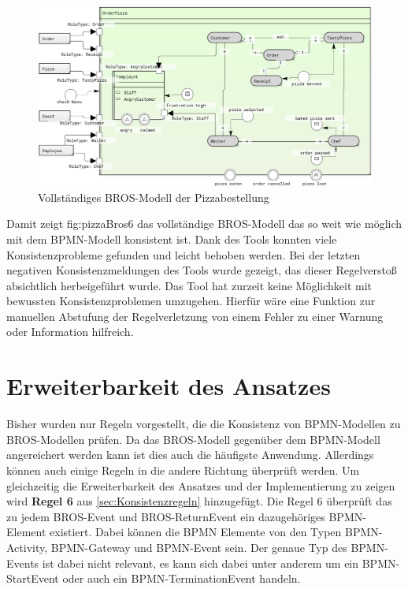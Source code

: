 \begin{figure}
    \centering
    \includegraphics[width=\textwidth,keepaspectratio]{../images/example/bros-rule6.png}%
    \caption{Vollständiges BROS-Modell der Pizzabestellung}%
    \label{fig:pizzaBros6}
\end{figure}

Damit zeigt {fig:pizzaBros6} das vollständige BROS-Modell das so weit wie möglich mit dem BPMN-Modell konsistent ist.
Dank des Tools konnten viele Konsistenzprobleme gefunden und leicht behoben werden.
Bei der letzten negativen Konsistenzmeldungen des Tools wurde gezeigt, das dieser Regelverstoß absichtlich herbeigeführt wurde.
Das Tool hat zurzeit keine Möglichkeit mit bewussten Konsistenzproblemen umzugehen.
Hierfür wäre eine Funktion zur manuellen Abstufung der Regelverletzung von einem Fehler zu einer Warnung oder Information hilfreich.

\section{Erweiterbarkeit des Ansatzes}

Bisher wurden nur Regeln vorgestellt, die die Konsistenz von BPMN-Modellen zu BROS-Modellen prüfen.
Da das BROS-Modell gegenüber dem BPMN-Modell angereichert werden kann ist dies auch die häufigste Anwendung.
Allerdings können auch einige Regeln in die andere Richtung überprüft werden.
Um gleichzeitig die Erweiterbarkeit des Ansatzes und der Implementierung zu zeigen wird \textbf{Regel 6} aus \cref{sec:Konsistenzregeln} hinzugefügt.
Die Regel 6 überprüft das zu jedem BROS-Event und BROS-ReturnEvent ein dazugehöriges BPMN-Element existiert. 
Dabei können die BPMN Elemente von den Typen BPMN-Activity, BPMN-Gateway und BPMN-Event sein. 
Der genaue Typ des BPMN-Events ist dabei nicht relevant, es kann sich dabei unter anderem um ein BPMN-StartEvent oder auch ein BPMN-TerminationEvent handeln.

